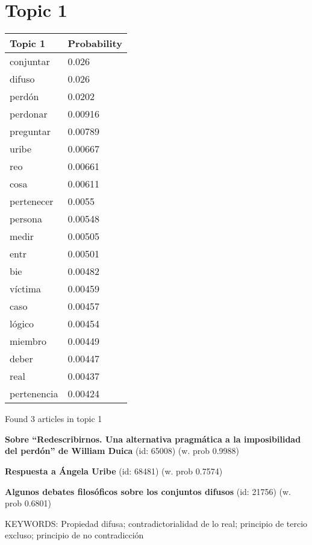 \documentclass{article}
\begin{document}
\section*{Topic 1}\vfill
\begin{tabular}{ll}
\toprule
     Topic 1 & Probability \\
\midrule
   conjuntar &       0.026 \\
      difuso &       0.026 \\
      perdón &      0.0202 \\
    perdonar &     0.00916 \\
   preguntar &     0.00789 \\
       uribe &     0.00667 \\
         reo &     0.00661 \\
        cosa &     0.00611 \\
  pertenecer &      0.0055 \\
     persona &     0.00548 \\
       medir &     0.00505 \\
        entr &     0.00501 \\
         bie &     0.00482 \\
     víctima &     0.00459 \\
        caso &     0.00457 \\
      lógico &     0.00454 \\
     miembro &     0.00449 \\
       deber &     0.00447 \\
        real &     0.00437 \\
 pertenencia &     0.00424 \\
\bottomrule
\end{tabular}

\vfill
Found 3 articles in topic 1
\vfill

\textbf{Sobre “Redescribirnos. Una alternativa pragmática a la imposibilidad del perdón” de William Duica} (id: 65008)
 (w. prob 0.9988)
\vfill

\textbf{Respuesta a Ángela Uribe} (id: 68481)
 (w. prob 0.7574)
\vfill

\textbf{Algunos debates filosóficos sobre los conjuntos difusos} (id: 21756)
 (w. prob 0.6801)


KEYWORDS:
Propiedad difusa; contradictorialidad de lo real; principio de tercio excluso; principio de no contradicción

\vfill
\newpage


\centering
\thispagestyle{empty}
\end{document}
